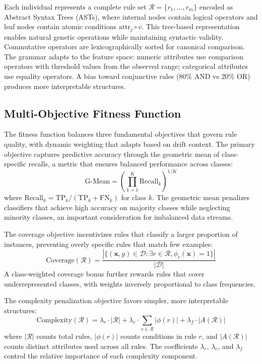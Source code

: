 \documentclass[lettersize,journal]{IEEEtran}
\begin{document}
Each individual represents a complete rule set $\mathcal{R} = \{r_1, \ldots, r_m\}$ encoded as Abstract Syntax Trees (ASTs), where internal nodes contain logical operators and leaf nodes contain atomic conditions $\text{attr}_j \circ v$. This tree-based representation enables natural genetic operations while maintaining syntactic validity. Commutative operators are lexicographically sorted for canonical comparison. The grammar adapts to the feature space: numeric attributes use comparison operators with threshold values from the observed range; categorical attributes use equality operators. A bias toward conjunctive rules (80\% AND vs 20\% OR) produces more interpretable structures.


\subsection{Multi-Objective Fitness Function}

The fitness function balances three fundamental objectives that govern rule quality, with dynamic weighting that adapts based on drift context. The primary objective captures predictive accuracy through the geometric mean of class-specific recalls, a metric that ensures balanced performance across classes:
\begin{equation}
    \text{G-Mean} = \left( \prod_{k=1}^{K} \text{Recall}_k \right)^{1/K}
    \label{eq:gmean}
\end{equation}
where $\text{Recall}_k = \text{TP}_k / (\text{TP}_k + \text{FN}_k)$ for class $k$. The geometric mean penalizes classifiers that achieve high accuracy on majority classes while neglecting minority classes, an important consideration for imbalanced data streams.

The coverage objective incentivizes rules that classify a larger proportion of instances, preventing overly specific rules that match few examples:
\begin{equation}
    \text{Coverage}(\mathcal{R}) = \frac{|\{(\mathbf{x}, y) \in \mathcal{D} : \exists r \in \mathcal{R}, \phi_r(\mathbf{x}) = 1\}|}{|\mathcal{D}|}
\end{equation}
A class-weighted coverage bonus further rewards rules that cover underrepresented classes, with weights inversely proportional to class frequencies.

The complexity penalization objective favors simpler, more interpretable structures:
\begin{equation}
    \text{Complexity}(\mathcal{R}) = \lambda_r \cdot |\mathcal{R}| + \lambda_c \cdot \sum_{r \in \mathcal{R}} |\phi(r)| + \lambda_f \cdot |A(\mathcal{R})|
\end{equation}
where $|\mathcal{R}|$ counts total rules, $|\phi(r)|$ counts conditions in rule $r$, and $|A(\mathcal{R})|$ counts distinct attributes used across all rules. The coefficients $\lambda_r$, $\lambda_c$, and $\lambda_f$ control the relative importance of each complexity component.
\end{document}
